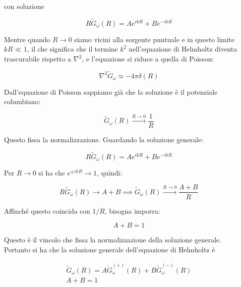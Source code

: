 con soluzione 

\begin{equation}
    R \tilde{G}_{\omega}(R) = A e^{ikR} + B e^{-ikR}
\end{equation}

Mentre quando $R \to 0$ siamo vicini alla sorgente puntuale e in questo limite $kR \ll 1$, il che significa che il termine $k^2$ nell'equazione di Helmholtz diventa trascurabile rispetto a $\nabla^2$, e l'equazione si riduce a quella di Poisson:

\begin{equation}
    \nabla^2 \tilde{G}_{\omega} \approx -4\pi \delta(R)
\end{equation}

Dall'equazione di Poisson sappiamo già che la soluzione è il potenziale columbiano: 

\begin{equation}
    \tilde{G}_{\omega}(R) \xrightarrow{R \to 0} \frac{1}{R}
\end{equation}

Questo fissa la normalizzazione. Guardando la soluzione generale:

\begin{equation*}
    R \tilde{G}_{\omega}(R) = A e^{ikR} + B e^{-ikR}
\end{equation*}

Per $R \to 0$ si ha che $e^{\pm i kR} \to 1$, quindi:

\begin{equation*}
    R \tilde{G}_{\omega}(R) \to A + B \implies \tilde{G}_{\omega}(R) \xrightarrow{R \to 0} \frac{A + B}{R}
\end{equation*}

Affinché questo coincida con $1/R$, bisogna imporra:

\begin{equation}
    A + B = 1
\end{equation}

Questo è il vincolo che fissa la normalizzazione della soluzione generale. \\

Pertanto si ha che la soluzione generale dell'equazione di Helmholtz è 

\begin{tcolorbox}[colback=yellow!10!white, colframe=orange!70!black, boxrule=0.8pt]
\begin{align} 
    \tilde{G}_{\omega}(R) = A \tilde{G}_{\omega}^{(+)}(R) + B \tilde{G}_{\omega}^{(-)}(R) \\
    A + B = 1
\end{align}
\end{tcolorbox}

